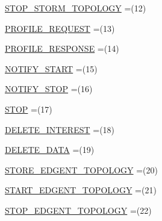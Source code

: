 \begin{DoxyCompactItemize}
\item 
\hyperlink{enumcom_1_1rutgers_1_1Core_1_1Message_1_1ARMessage_1_1Action_a0b3dd4140eb045a6f84fe487f2373e27}{S\+T\+O\+P\+\_\+\+S\+T\+O\+R\+M\+\_\+\+T\+O\+P\+O\+L\+O\+GY} =(12)
\item 
\hyperlink{enumcom_1_1rutgers_1_1Core_1_1Message_1_1ARMessage_1_1Action_a64d938ef2e15a0d2d3bf3a4b0f1ad421}{P\+R\+O\+F\+I\+L\+E\+\_\+\+R\+E\+Q\+U\+E\+ST} =(13)
\item 
\hyperlink{enumcom_1_1rutgers_1_1Core_1_1Message_1_1ARMessage_1_1Action_af08da2f44aad630ff583e7f5f51f4cfd}{P\+R\+O\+F\+I\+L\+E\+\_\+\+R\+E\+S\+P\+O\+N\+SE} =(14)
\item 
\hyperlink{enumcom_1_1rutgers_1_1Core_1_1Message_1_1ARMessage_1_1Action_a12bf1d5ab86f517d2df63bdc3a9b5506}{N\+O\+T\+I\+F\+Y\+\_\+\+S\+T\+A\+RT} =(15)
\item 
\hyperlink{enumcom_1_1rutgers_1_1Core_1_1Message_1_1ARMessage_1_1Action_acb3f41aefe125197dc119b316939759d}{N\+O\+T\+I\+F\+Y\+\_\+\+S\+T\+OP} =(16)
\item 
\hyperlink{enumcom_1_1rutgers_1_1Core_1_1Message_1_1ARMessage_1_1Action_a13340ac845ebf54c99021c2d6e258a77}{S\+T\+OP} =(17)
\item 
\hyperlink{enumcom_1_1rutgers_1_1Core_1_1Message_1_1ARMessage_1_1Action_a045685c23dcda10502b90997f9e4e2c8}{D\+E\+L\+E\+T\+E\+\_\+\+I\+N\+T\+E\+R\+E\+ST} =(18)
\item 
\hyperlink{enumcom_1_1rutgers_1_1Core_1_1Message_1_1ARMessage_1_1Action_a764c16f3474473262914da723c9d3562}{D\+E\+L\+E\+T\+E\+\_\+\+D\+A\+TA} =(19)
\item 
\hyperlink{enumcom_1_1rutgers_1_1Core_1_1Message_1_1ARMessage_1_1Action_a4fee38acd37c26881f193a3587645919}{S\+T\+O\+R\+E\+\_\+\+E\+D\+G\+E\+N\+T\+\_\+\+T\+O\+P\+O\+L\+O\+GY} =(20)
\item 
\hyperlink{enumcom_1_1rutgers_1_1Core_1_1Message_1_1ARMessage_1_1Action_a85e385507aa8578d36b6e3dc3399b269}{S\+T\+A\+R\+T\+\_\+\+E\+D\+G\+E\+N\+T\+\_\+\+T\+O\+P\+O\+L\+O\+GY} =(21)
\item 
\hyperlink{enumcom_1_1rutgers_1_1Core_1_1Message_1_1ARMessage_1_1Action_a8a75d2e395d6db96c236eb5e8a38a21e}{S\+T\+O\+P\+\_\+\+E\+D\+G\+E\+N\+T\+\_\+\+T\+O\+P\+O\+L\+O\+GY} =(22)
\end{DoxyCompactItemize}
